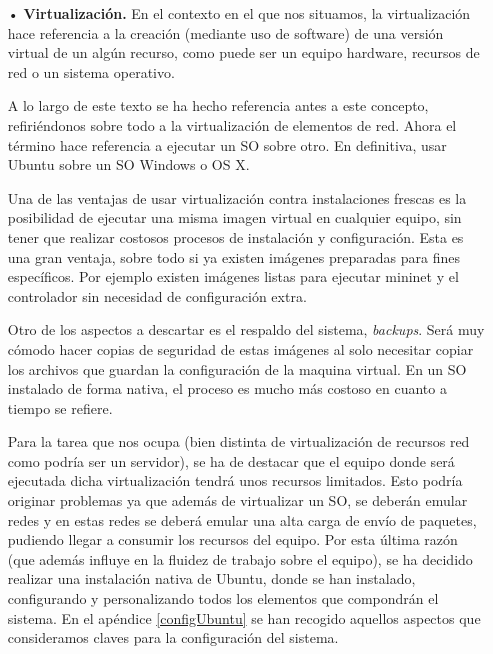 \documentclass[a4paper,11pt]{book}
\begin{document}
\begin{itemize}
\item[•] \textbf{Virtualización.} En el contexto en el que nos situamos, la virtualización hace referencia a la creación (mediante uso de software) de una versión virtual de un algún recurso, como puede ser un equipo hardware, recursos de red o un sistema operativo.

A lo largo de este texto se ha hecho referencia antes a este concepto, refiriéndonos sobre todo a la virtualización de elementos de red. Ahora el término hace referencia a ejecutar un \ac{SO} sobre otro. En definitiva, usar Ubuntu sobre un \ac{SO} Windows o OS X.

Una de las ventajas de usar virtualización contra instalaciones frescas es la posibilidad de ejecutar una misma imagen virtual en cualquier equipo, sin tener que realizar costosos procesos de instalación y configuración. Esta es una gran ventaja, sobre todo si ya existen imágenes preparadas para fines específicos. Por ejemplo existen imágenes listas para ejecutar mininet y el controlador sin necesidad de configuración extra.

Otro de los aspectos a descartar es el respaldo del sistema, \textit{backups}. Será muy cómodo hacer copias de seguridad de estas imágenes al solo necesitar copiar los archivos que guardan la configuración de la maquina virtual. En un \ac{SO} instalado de forma nativa, el proceso es mucho más costoso en cuanto a tiempo se refiere. 

Para la tarea que nos ocupa (bien distinta de virtualización de recursos red como podría ser un servidor), se ha de destacar que el equipo donde será ejecutada dicha virtualización tendrá unos recursos limitados. Esto podría originar problemas ya que además de virtualizar un \ac{SO}, se deberán emular redes y en estas redes se deberá emular una alta carga de envío de paquetes, pudiendo llegar a consumir los recursos del equipo. Por esta última razón (que además influye en la fluidez de trabajo sobre el equipo), se ha decidido realizar una instalación nativa de Ubuntu, donde se han instalado, configurando y personalizando todos los elementos que compondrán el sistema. En el apéndice \ref{configUbuntu} se han recogido aquellos aspectos que consideramos claves para la configuración del sistema.


\end{itemize}
\end{document}
